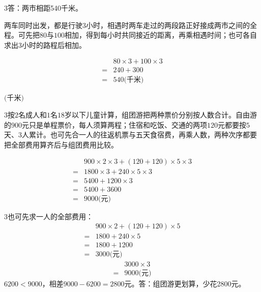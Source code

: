 \documentclass[multi=snippet,border={5bp 20bp 5bp 5bp}]{standalone}
\newenvironment{snippet}[3]{\begin{minipage}{#1bp}\color{answerred}\fontsize{#2}{#3}\selectfont\raggedright}{\end{minipage}}
\begin{document}
\begin{snippet}{505}{11.5}{14}\begin{multicols}{3}\raggedcolumns 答：两市相距540千米。\par 两车同时出发，都是行驶\(3\)\allowbreak 小时，相遇时两车走过的两段路正好接成两市之间的全程。可先把\(80\)\allowbreak 与\(100\)\allowbreak 相加，得到每小时共同接近的距离，再乘相遇时间；也可各自求出\(3\)\allowbreak 小时的路程后相加。\par \[\begin{aligned}&80\times3+100\times3\\={}&240+300\\={}&540\text{(千米)}\end{aligned}\]\end{multicols}\end{snippet}
\begin{snippet}{80}{9.4}{14}\SourceSans\setlength{\mathindent}{2bp}\(\text{(千米)}\)\end{snippet}
\begin{snippet}{505}{11.5}{14}\begin{multicols}{3}\raggedcolumns 按\(2\)\allowbreak 名成人和\(1\)\allowbreak 名\(18\)\allowbreak 岁以下儿童计算，组团游把两种票价分别按人数合计。自由游的\(900\)\allowbreak 元只是单程票价，每人须算两程；住宿和吃饭、交通的两项\(120\)\allowbreak 元都要按\(5\)\allowbreak 天、\(3\)\allowbreak 人累计。也可先合一人的往返机票与五天食宿费，再乘人数，两种次序都要把全部费用算齐后与组团费用比较。\par \end{multicols}\[\begin{aligned}&900\times2\times3+(120+120)\times5\times3\\={}&1800\times3+240\times5\times3\\={}&5400+1200\times3\\={}&5400+3600\\={}&9000\text{(元)}\end{aligned}\]\begin{multicols}{3}\raggedcolumns 也可先求一人的全部费用：\[\begin{aligned}&900\times2+(120+120)\times5\\={}&1800+240\times5\\={}&1800+1200\\={}&3000\text{(元)}\end{aligned}\]\[\begin{aligned}&3000\times3\\={}&9000\text{(元)}\end{aligned}\]\(6200<9000\)\allowbreak ，相差\(9000-6200=2800\)\allowbreak 元。答：组团游更划算，少花2800元。\end{multicols}\end{snippet}
\end{document}
